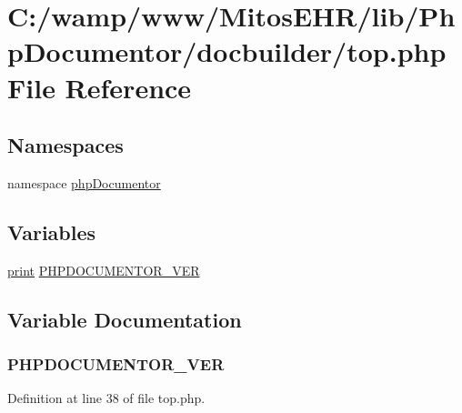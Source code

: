 \hypertarget{top_8php}{\section{\-C\-:/wamp/www/\-Mitos\-E\-H\-R/lib/\-Php\-Documentor/docbuilder/top.php \-File \-Reference}
\label{top_8php}
}
\subsection*{\-Namespaces}
\begin{DoxyCompactItemize}
\item 
namespace \hyperlink{namespacephp_documentor}{php\-Documentor}
\end{DoxyCompactItemize}
\subsection*{\-Variables}
\begin{DoxyCompactItemize}
\item 
\hyperlink{tokenizer__test_8php_a3ad3a4240c0f97c7e85aff5c52a454d4}{print} \hyperlink{top_8php_a81d37434d16bfdfff23e418fa4f0e37e}{\-P\-H\-P\-D\-O\-C\-U\-M\-E\-N\-T\-O\-R\-\_\-\-V\-E\-R}
\end{DoxyCompactItemize}


\subsection{\-Variable \-Documentation}
\hypertarget{top_8php_a81d37434d16bfdfff23e418fa4f0e37e}{
\subsubsection[{\-P\-H\-P\-D\-O\-C\-U\-M\-E\-N\-T\-O\-R\-\_\-\-V\-E\-R}]{ {\bf \-P\-H\-P\-D\-O\-C\-U\-M\-E\-N\-T\-O\-R\-\_\-\-V\-E\-R}}}\label{top_8php_a81d37434d16bfdfff23e418fa4f0e37e}


\-Definition at line 38 of file top.\-php.


